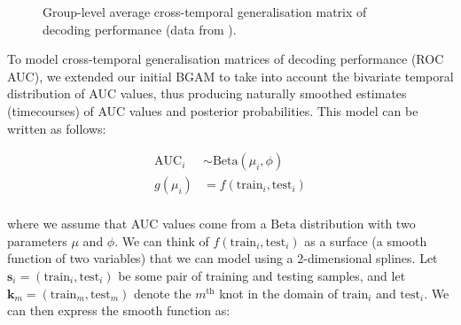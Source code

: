 \documentclass[
  doc,
  floatsintext,
  longtable,
  a4paper,
  nolmodern,
  notxfonts,
  notimes,
  colorlinks=true,linkcolor=blue,citecolor=blue,urlcolor=blue]{apa7}
\begin{document}
\begin{figure}[!htb]

\caption{\label{fig-timegen}Group-level average cross-temporal
generalisation matrix of decoding performance (data from
).}


\end{figure}%

\setlength{\parindent}{0pt}
\setlength{\parskip}{6pt}

To model cross-temporal generalisation matrices of decoding performance
(ROC AUC), we extended our initial BGAM to take into account the
bivariate temporal distribution of AUC values, thus producing naturally
smoothed estimates (timecourses) of AUC values and posterior
probabilities. This model can be written as follows:

\[
\begin{aligned}
\text{AUC}_{i} &\sim \mathrm{Beta}(\mu_{i}, \phi)\\
g(\mu_{i}) &= f \left(\text{train}_{i}, \text{test}_{i} \right)\\
\end{aligned}
\]

\setlength{\parindent}{0pt}
\setlength{\parskip}{6pt}

where we assume that AUC values come from a \(\mathrm{Beta}\)
distribution with two parameters \(\mu\) and \(\phi\). We can think of
\(f \left(\text{train}_{i}, \text{test}_{i} \right)\) as a surface (a
smooth function of two variables) that we can model using a
2-dimensional splines. Let
\(\mathbf{s}_{i} = \left(\text{train}_{i}, \text{test}_{i} \right)\) be
some pair of training and testing samples, and let
\(\mathbf{k}_{m} = \left(\text{train}_{m}, \text{test}_{m} \right)\)
denote the \(m^{\text{th}}\) knot in the domain of \(\text{train}_{i}\)
and \(\text{test}_{i}\). We can then express the smooth function as:
\end{document}

